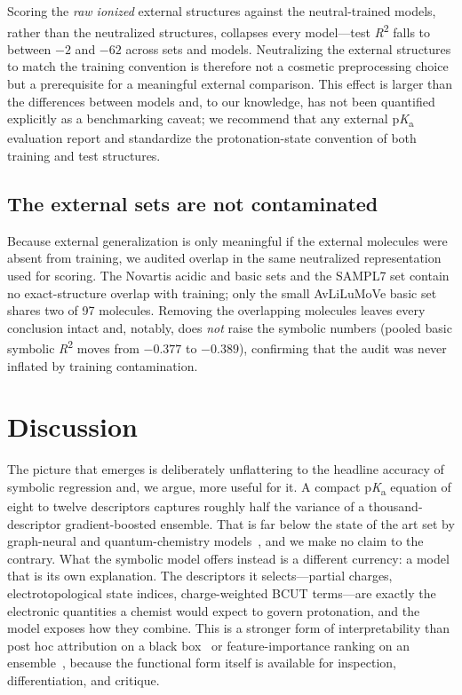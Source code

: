 \documentclass[11pt]{article}
\newcommand{\pka}{p\textit{K}\textsubscript{a}}
\newcommand{\rtwo}{\textit{R}\textsuperscript{2}}
\begin{document}
Scoring the \emph{raw ionized} external structures against the neutral-trained models, rather
than the neutralized structures, collapses every model---test \rtwo{} falls to between $-2$ and
$-62$ across sets and models. Neutralizing the external structures to match the training
convention is therefore not a cosmetic preprocessing choice but a prerequisite for a meaningful
external comparison. This effect is larger than the differences between models and, to our
knowledge, has not been quantified explicitly as a benchmarking caveat; we recommend that any
external \pka{} evaluation report and standardize the protonation-state convention of both
training and test structures.

\subsection{The external sets are not contaminated}

Because external generalization is only meaningful if the external molecules were absent from
training, we audited overlap in the same neutralized representation used for scoring. The
Novartis acidic and basic sets and the SAMPL7 set contain no exact-structure overlap with
training; only the small AvLiLuMoVe basic set shares two of 97 molecules. Removing the
overlapping molecules leaves every conclusion intact and, notably, does \emph{not} raise the
symbolic numbers (pooled basic symbolic \rtwo{} moves from $-0.377$ to $-0.389$), confirming
that the audit was never inflated by training contamination.

\section{Discussion}

The picture that emerges is deliberately unflattering to the headline accuracy of symbolic
regression and, we argue, more useful for it. A compact \pka{} equation of eight to twelve
descriptors captures roughly half the variance of a thousand-descriptor gradient-boosted
ensemble. That is far below the state of the art set by graph-neural and quantum-chemistry
models~\cite{abarbanel2024qupkake,qiu2024sat4pka,decorte2025bclxpka}, and we make no claim to
the contrary. What the symbolic model offers instead is a different currency: a model that is
its own explanation. The descriptors it selects---partial charges, electrotopological state
indices, charge-weighted BCUT terms---are exactly the electronic quantities a chemist would
expect to govern protonation, and the model exposes how they combine. This is a stronger form of
interpretability than post hoc attribution on a black box~\cite{decorte2025bclxpka} or
feature-importance ranking on an ensemble~\cite{shen2026catboostpka}, because the functional form
itself is available for inspection, differentiation, and critique.
\end{document}

